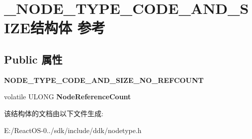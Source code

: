 \hypertarget{struct___n_o_d_e___t_y_p_e___c_o_d_e___a_n_d___s_i_z_e}{}\section{\+\_\+\+N\+O\+D\+E\+\_\+\+T\+Y\+P\+E\+\_\+\+C\+O\+D\+E\+\_\+\+A\+N\+D\+\_\+\+S\+I\+Z\+E结构体 参考}
\label{struct___n_o_d_e___t_y_p_e___c_o_d_e___a_n_d___s_i_z_e}
\subsection*{Public 属性}
\begin{DoxyCompactItemize}
\item 
\mbox{\label{struct___n_o_d_e___t_y_p_e___c_o_d_e___a_n_d___s_i_z_e_a6c2951dd7825baa9e2d2112caadc7590}} 
{\bfseries N\+O\+D\+E\+\_\+\+T\+Y\+P\+E\+\_\+\+C\+O\+D\+E\+\_\+\+A\+N\+D\+\_\+\+S\+I\+Z\+E\+\_\+\+N\+O\+\_\+\+R\+E\+F\+C\+O\+U\+NT}
\item 
\mbox{\label{struct___n_o_d_e___t_y_p_e___c_o_d_e___a_n_d___s_i_z_e_a947216be2c373310ecfe0fbbda930418}} 
volatile U\+L\+O\+NG {\bfseries Node\+Reference\+Count}
\end{DoxyCompactItemize}


该结构体的文档由以下文件生成\+:\begin{DoxyCompactItemize}
\item 
E\+:/\+React\+O\+S-\/0../sdk/include/ddk/nodetype.\+h\end{DoxyCompactItemize}
